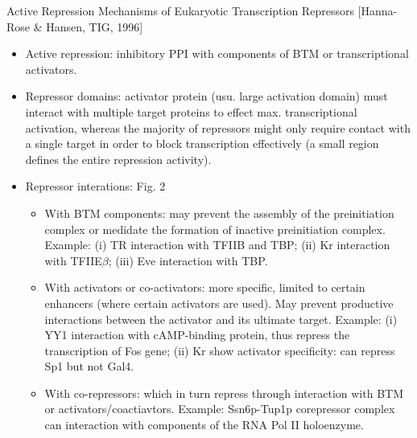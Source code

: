 \documentclass{report}
\begin{document}
Active Repression Mechanisms of Eukaryotic Transcription Repressors [Hanna-Rose \& Hansen, TIG, 1996]
\begin{itemize}
	\item Active repression: inhibitory PPI with components of BTM or transcriptional activators. 
	
	\item Repressor domains: activator protein (usu. large activation domain) must interact with multiple target proteins to effect max. transcriptional activation, whereas the majority of repressors might only require contact with a single target in order to block transcription effectively (a small region defines the entire repression activity). 
	
	\item Repressor interations: Fig. 2
	\begin{itemize}
		\item With BTM components: may prevent the assembly of the preinitiation complex or medidate the formation of inactive preinitiation complex. Example: (i) TR interaction with TFIIB and TBP; (ii) Kr interaction with TFIIE$\beta$; (iii) Eve interaction with TBP. 
		\item With activators or co-activators: more specific, limited to certain enhancers (where certain activators are used). May prevent productive interactions between the activator and its ultimate target. Example: (i) YY1 interaction with cAMP-binding protein, thus repress the transcription of Fos gene; (ii) Kr show activator specificity: can repress Sp1 but not Gal4. 
		\item With co-repressors: which in turn repress through interaction with BTM or activators/coactiavtors. Example: Ssn6p-Tup1p corepressor complex can interaction with components of the RNA Pol II holoenzyme.   
	\end{itemize}
\end{itemize}
\end{document}

